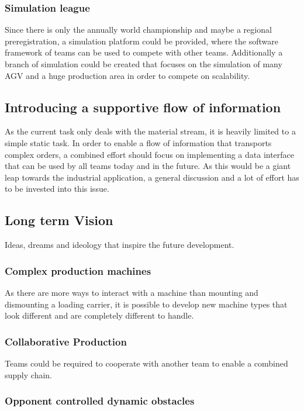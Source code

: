 \documentclass[12pt,twoside]{article}
\begin{document}
\subsubsection{Simulation league}

Since there is only the annually world championship and maybe a
regional preregistration, a simulation platform could be provided,
where the software framework of teams can be used to compete with
other teams. Additionally a branch of simulation could be created that
focuses on the simulation of many AGV and a huge production area in
order to compete on scalability.

\subsection{Introducing a supportive flow of information}

As the current task only deals with the material stream, it is heavily limited to a simple static task. In order to enable a flow of information that transports complex orders, a combined effort should focus on implementing a data interface that can be used by all teams today and in the future. As this would be a giant leap towards the industrial application, a general discussion and a lot of effort has to be invested into this issue.


\subsection{Long term Vision}

Ideas, dreams and ideology that inspire the future development.

\subsubsection{Complex production machines}

As there are more ways to interact with a machine than mounting and dismounting a loading carrier, it is possible to develop new machine types that look different and are completely different to handle.

\subsubsection{Collaborative Production}

Teams could be required to cooperate with another team to enable a
combined supply chain. 

\subsubsection{Opponent controlled dynamic obstacles}
\end{document}

